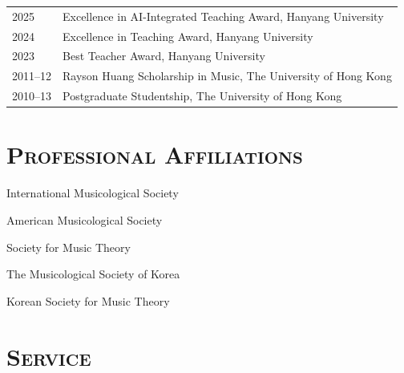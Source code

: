 \documentclass[a4paper,11pt,draft]{article}
\begin{document}
  \hspace*{-0.25cm}
  \begin{tabular}{p{2.5cm} l}
	2025 & Excellence in AI-Integrated Teaching Award, Hanyang University\\
	
	2024 & Excellence in Teaching Award, Hanyang University\\
    
    2023 & Best Teacher Award, Hanyang University\\
    
    2011--12 & Rayson Huang Scholarship in Music, The University of Hong Kong\\
    
    2010--13 & Postgraduate Studentship, The University of Hong Kong
  \end{tabular}
  
  \newpage
  \section*{\textsc{Professional Affiliations}}
  
  International Musicological Society
  
  \noindent American Musicological Society
  
  \noindent Society for Music Theory
  
  \noindent The Musicological Society of Korea
  
  \noindent Korean Society for Music Theory
  
  \vspace*{5mm}
  
  \section*{\textsc{Service}}
  
\end{document}
